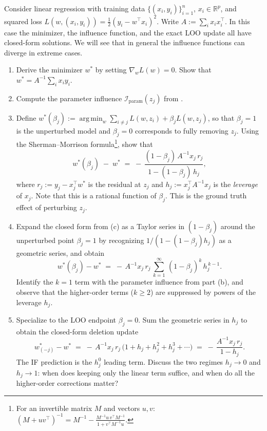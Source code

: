 \documentclass[11pt]{article}
\DeclareMathOperator*{\argmin}{arg\,min}
\begin{document}
\begin{exercise}\label{ex:ols-if}
Consider linear regression with training data $\{(x_i,y_i)\}_{i=1}^n$, $x_i\in\mathbb{R}^p$, and squared loss $L(w,(x_i,y_i)) = \tfrac12(y_i - w^\top x_i)^2$. Write $A := \sum_i x_i x_i^\top$. In this case the minimizer, the influence function, and the exact LOO update all have closed-form solutions. We will see that in general the influence functions can diverge in extreme cases.
\begin{enumerate}
  \item[(a)] Derive the minimizer $w^*$ by setting $\nabla_w L(w) = 0$. Show that $w^* = A^{-1}\sum_i x_i y_i$.
  \item[(b)] Compute the parameter influence $\mathcal{I}_{\mathrm{param}}(z_j)$ from .
  \item[(c)] Define $w^*(\beta_j) := \argmin_w \sum_{i\ne j} L(w,z_i) + \beta_j L(w,z_j)$, so that $\beta_j = 1$ is the unperturbed model and $\beta_j = 0$ corresponds to fully removing $z_j$. Using the Sherman--Morrison formula\footnote{For an invertible matrix $M$ and vectors $u,v$: $(M + uv^\top)^{-1} = M^{-1} - \frac{M^{-1}u\,v^\top M^{-1}}{1 + v^\top M^{-1}u}$.}, show that
  \[
    w^*(\beta_j) \;-\; w^* \;=\; -\,\frac{(1-\beta_j)\,A^{-1} x_j\,r_j}{1 - (1-\beta_j)\,h_j},
  \]
  where $r_j := y_j - x_j^\top w^*$ is the residual at $z_j$ and $h_j := x_j^\top A^{-1} x_j$ is the \emph{leverage} of $x_j$. Note that this is a rational function of $\beta_j$. This is the ground truth effect of perturbing $z_j$.
  \item[(d)] Expand the closed form from (c) as a Taylor series in $(1-\beta_j)$ around the unperturbed point $\beta_j = 1$ by recognizing $1/(1 - (1-\beta_j)h_j)$ as a geometric series, and obtain
  \[
    w^*(\beta_j) - w^* \;=\; -\,A^{-1} x_j\,r_j\,\sum_{k=1}^{\infty}\,(1-\beta_j)^k\,h_j^{\,k-1}.
  \]
  Identify the $k=1$ term with the parameter influence from part (b), and observe that the higher-order terms ($k \ge 2$) are suppressed by powers of the leverage $h_j$.
  \item[(e)] Specialize to the LOO endpoint $\beta_j = 0$. Sum the geometric series in $h_j$ to obtain the closed-form deletion update
  \[
    w^*_{(-j)} - w^* \;=\; -\,A^{-1} x_j\,r_j\,\bigl(1 + h_j + h_j^{2} + h_j^{3} + \cdots\bigr) \;=\; -\,\frac{A^{-1} x_j\,r_j}{1 - h_j}.
  \]
  The IF prediction is the $h_j^0$ leading term. Discuss the two regimes $h_j \to 0$ and $h_j \to 1$: when does keeping only the linear term suffice, and when do all the higher-order corrections matter?
\end{enumerate}
\end{exercise}
\end{document}
